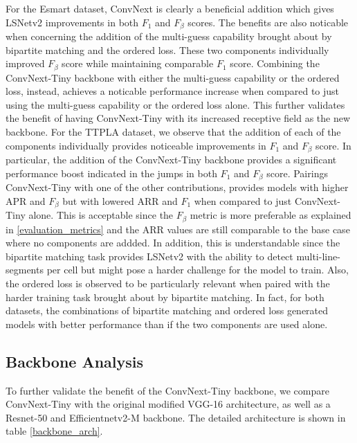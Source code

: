 \documentclass[journal]{IEEEtran}
\begin{document}
For the Esmart dataset, ConvNext is clearly a beneficial addition which gives LSNetv2 improvements in both $F_1$ and $F_{\beta}$ scores. The benefits are also noticable when concerning the addition of the multi-guess capability brought about by bipartite matching and the ordered loss. These two components individually improved $F_{\beta}$ score while maintaining comparable $F_1$ score. Combining the ConvNext-Tiny backbone with either the multi-guess capability or the ordered loss, instead, achieves a noticable performance increase when compared to just using the multi-guess capability or the ordered loss alone. This further validates the benefit of having ConvNext-Tiny with its increased receptive field as the new backbone. 
For the TTPLA dataset, we observe that the addition of each of the components individually provides noticeable improvements in $F_1$ and $F_{\beta}$ score. 
In particular, the addition of the ConvNext-Tiny backbone provides a significant performance boost indicated in the jumps in both $F_1$ and $F_{\beta}$ score. Pairings ConvNext-Tiny with one of the other contributions, provides models with higher APR and $F_{\beta}$ but with lowered ARR and $F_1$ when compared to just ConvNext-Tiny alone. This is acceptable since the $F_{\beta}$ metric is more preferable as explained in \ref{evaluation_metrics} and the ARR values are still comparable to the base case where no components are addded. In addition, this is understandable since the bipartite matching task provides LSNetv2 with the ability to detect multi-line-segments per cell but might pose a harder challenge for the model to train. Also, the ordered loss is observed to be particularly relevant when paired with the harder training task brought about by bipartite matching. In fact, for both datasets, the combinations of bipartite matching and ordered loss generated models with better performance than if the two components are used alone. 

\subsection{Backbone Analysis}

To further validate the benefit of the ConvNext-Tiny backbone, we compare ConvNext-Tiny with the original modified VGG-16 architecture, as well as a Resnet-50 and Efficientnetv2-M backbone. The detailed architecture is shown in table \ref{backbone_arch}.
\end{document}
